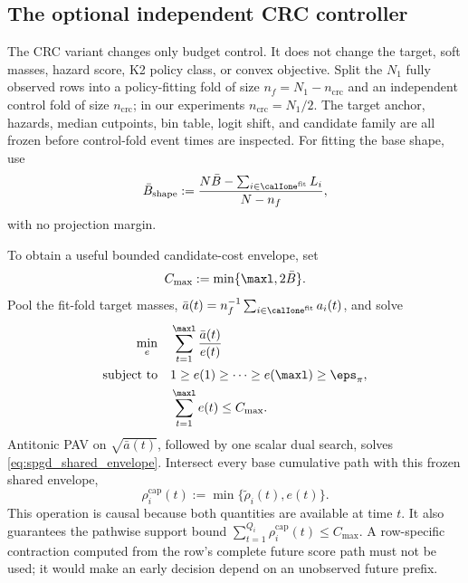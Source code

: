 \subsection{The optional independent CRC controller}
\label{sec:spgd_crc}

The CRC variant changes only budget control.  It does not change the target,
soft masses, hazard score, K2 policy class, or convex objective.  Split the
$N_1$ fully observed rows into a policy-fitting fold of size
$n_f=N_1-n_{\mathrm{crc}}$ and an independent control fold of size
$n_{\mathrm{crc}}$; in our experiments $n_{\mathrm{crc}}=N_1/2$.  The target
anchor, hazards, median cutpoints, bin table, logit shift, and candidate family
are all frozen before control-fold event times are inspected.  For fitting
the base shape, use
\begin{equation}
    \bar B_{\mathrm{shape}}
    :=\frac{N\bar B-\sum_{i\in\calIone^{\mathrm{fit}}}L_i}
            {N-n_f},
    \label{eq:spgd_crc_shape_budget}
\end{equation}
with no projection margin.

To obtain a useful bounded candidate-cost envelope, set
\begin{equation}
    C_{\max}:=\min\{\maxl,2\bar B\}.
    \label{eq:spgd_row_cap}
\end{equation}
Pool the fit-fold target masses,
$\bar a(t)=n_f^{-1}\sum_{i\in\calIone^{\mathrm{fit}}}a_i(t)$, and solve
\begin{equation}
\begin{aligned}
    \min_e\quad&\sum_{t=1}^{\maxl}\frac{\bar a(t)}{e(t)}\\
    \text{subject to}\quad
      &1\geq e(1)\geq\cdots\geq e(\maxl)\geq\eps_\pi,\\
      &\sum_{t=1}^{\maxl}e(t)\leq C_{\max}.
\end{aligned}
\label{eq:spgd_shared_envelope}
\end{equation}
Antitonic PAV on $\sqrt{\bar a(t)}$, followed by one scalar dual search,
solves \eqref{eq:spgd_shared_envelope}.  Intersect every base cumulative path
with this frozen shared envelope,
\begin{equation}
    \rho_i^{\mathrm{cap}}(t)
      :=\min\{\widetilde\rho_i(t),e(t)\}.
    \label{eq:spgd_apply_envelope}
\end{equation}
This operation is causal because both quantities are available at time $t$.
It also guarantees the pathwise support bound
$\sum_{t=1}^{Q_i}\rho_i^{\mathrm{cap}}(t)\leq C_{\max}$.  A row-specific
contraction computed from the row's complete future score path must not be
used; it would make an early decision depend on an unobserved future prefix.

